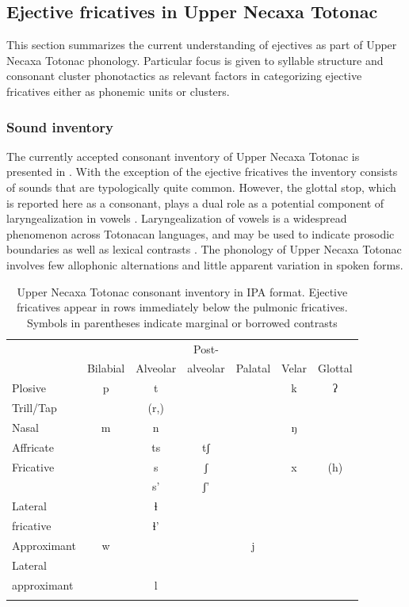 \documentclass[output=paper,colorlinks,citecolor=brown]{langscibook}
\begin{document}
\subsection{Ejective fricatives in Upper Necaxa Totonac}\label{section:phonology}
This section summarizes the current understanding of ejectives as part of Upper Necaxa Totonac phonology. Particular focus is given to syllable structure and consonant cluster phonotactics as relevant factors in categorizing ejective fricatives either as phonemic units or clusters. 

\subsubsection{Sound inventory}
The currently accepted consonant inventory of Upper Necaxa Totonac \citep{Beck2011} is presented in . With the exception of the ejective fricatives the inventory consists of sounds that are typologically quite common. However, the glottal stop, which is reported here as a consonant, plays a dual role as a potential component of laryngealization in vowels \citep{Puderbaugh2019a,Puderbaugh2019}. Laryngealization of vowels is a widespread phenomenon across Totonacan languages, and may be used to indicate prosodic boundaries as well as lexical contrasts \citep{Beck2004,Levy1987,Levy2015,Watters1980}. The phonology of Upper Necaxa Totonac involves few allophonic alternations and little apparent variation in spoken forms.

	\begin{table}
		\caption[UNT consonant inventory]{Upper Necaxa Totonac consonant inventory in IPA format. Ejective fricatives appear in rows immediately below the pulmonic fricatives. Symbols in parentheses indicate marginal or borrowed contrasts}
		\label{tab:UNTconsonants}
		\begin{tabular}{lcccccc}
			\lsptoprule
		    &         &         & Post- & \\
			&Bilabial &Alveolar &alveolar &Palatal &Velar &Glottal \\
			\midrule
			Plosive &p & t & & & k &ʔ \\
			Trill/Tap & &({r},\textfishhookr) & & & &\\
			Nasal & m & n & & &ŋ & \\
			Affricate & &ts &tʃ & & & \\
			Fricative & & s & {ʃ} & & x &(h) \\
			& &s' &ʃ' & & & \\
			Lateral &&ɬ&&&& \\
			\quad fricative &&ɬ'	&&&& \\
			Approximant & w & & &j & & \\
			Lateral & \\
			\quad approximant && l &&&& \\
			\lspbottomrule
		\end{tabular}
	\end{table}
\end{document}
